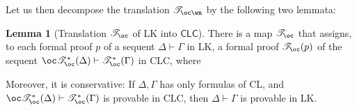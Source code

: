 \documentclass[a4paper]{article}
\theoremstyle{definition}
\theoremstyle{theorem}
\newtheorem{lemma}[definition]{Lemma}
\theoremstyle{remark}
\begin{document}
Let us then decompose the translation $\mathscr{T}_{\oc\wn}$ by the following two lemmata:
\begin{lemma}[Translation $\mathscr{T}_{\oc}$ of \textsf{LK} into $\textsf{CLC}$]
\label{LemTranslationOfLKintoCLLK}
There is a map $\mathscr{T}_{\oc}$ that assigns, to each formal proof $p$ of a sequent $\Delta \vdash \Gamma$ in \textsf{LK}, a formal proof $\mathscr{T}_{\oc}(p)$ of the sequent $\oc \mathscr{T}_{\oc}^\ast(\Delta) \vdash \mathscr{T}_{\oc}^\ast(\Gamma)$ in \textsf{CLC}, where

Moreover, it is conservative: If $\Delta, \Gamma$ has only formulas of CL, and $\oc \mathscr{T}_\oc^\ast(\Delta) \vdash \mathscr{T}_\oc^\ast(\Gamma)$ is provable in \textsf{CLC}, then $\Delta \vdash \Gamma$ is provable in \textsf{LK}.
\end{lemma}
\end{document}
